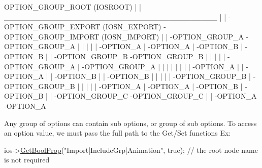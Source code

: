 \begin{DoxyVerb}                                       OPTION_GROUP_ROOT (IOSROOT)
                                       |
                                       |
                   ________________________________________
                   |                                      |     
                   -OPTION_GROUP_EXPORT (IOSN_EXPORT)     -OPTION_GROUP_IMPORT (IOSN_IMPORT)
                        |                                      |
                        -OPTION_GROUP_A                        -OPTION_GROUP_A
                        |     |                                |     |
                        |     -OPTION_A                        |     -OPTION_A
                        |     -OPTION_B                        |     -OPTION_B
                        |                                      |
                        -OPTION_GROUP_B                        -OPTION_GROUP_B
                        |     |                                |     |
                        |     -OPTION_GROUP_A                  |     -OPTION_GROUP_A
                        |     |     |                          |     |     |
                        |     |     -OPTION_A                  |     |     -OPTION_A
                        |     |     -OPTION_B                  |     |     -OPTION_B
                        |     |                                |     |
                        |     -OPTION_GROUP_B                  |     -OPTION_GROUP_B
                        |           |                          |           |
                        |           -OPTION_A                  |           -OPTION_A
                        |           -OPTION_B                  |           -OPTION_B 
                        |                                      |
                        -OPTION_GROUP_C                        -OPTION_GROUP_C
                              |                                      |
                              -OPTION_A                              -OPTION_A\end{DoxyVerb}


Any group of options can contain sub options, or group of sub options. To access an option value, we must pass the full path to the Get/\+Set functions Ex\+: 
\begin{DoxyCode}
ios->\hyperlink{class_fbx_i_o_settings_aa30a3e515f60aa1fcbd82b6b34994ad0}{GetBoolProp}(\textcolor{stringliteral}{"Import|IncludeGrp|Animation"}, \textcolor{keyword}{true}); \textcolor{comment}{// the root node name is not required}
\end{DoxyCode}


